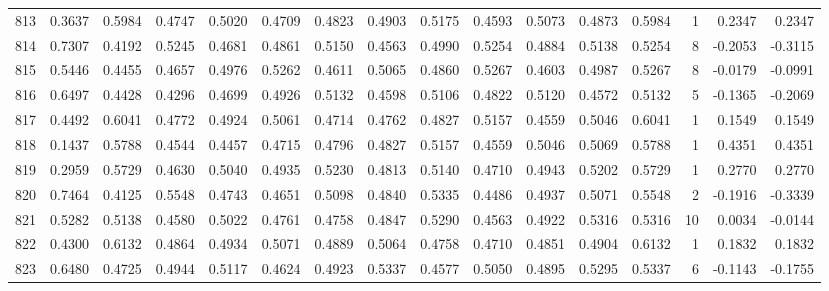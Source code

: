 \begin{tabular}{lrrrrrrrrrrrrrrr}
813 &      0.3637 &  0.5984 &  0.4747 &  0.5020 &  0.4709 &  0.4823 &  0.4903 &  0.5175 &  0.4593 &  0.5073 &   0.4873 &     0.5984 &      1 &                    0.2347 &                     0.2347 \\
814 &      0.7307 &  0.4192 &  0.5245 &  0.4681 &  0.4861 &  0.5150 &  0.4563 &  0.4990 &  0.5254 &  0.4884 &   0.5138 &     0.5254 &      8 &                   -0.2053 &                    -0.3115 \\
815 &      0.5446 &  0.4455 &  0.4657 &  0.4976 &  0.5262 &  0.4611 &  0.5065 &  0.4860 &  0.5267 &  0.4603 &   0.4987 &     0.5267 &      8 &                   -0.0179 &                    -0.0991 \\
816 &      0.6497 &  0.4428 &  0.4296 &  0.4699 &  0.4926 &  0.5132 &  0.4598 &  0.5106 &  0.4822 &  0.5120 &   0.4572 &     0.5132 &      5 &                   -0.1365 &                    -0.2069 \\
817 &      0.4492 &  0.6041 &  0.4772 &  0.4924 &  0.5061 &  0.4714 &  0.4762 &  0.4827 &  0.5157 &  0.4559 &   0.5046 &     0.6041 &      1 &                    0.1549 &                     0.1549 \\
818 &      0.1437 &  0.5788 &  0.4544 &  0.4457 &  0.4715 &  0.4796 &  0.4827 &  0.5157 &  0.4559 &  0.5046 &   0.5069 &     0.5788 &      1 &                    0.4351 &                     0.4351 \\
819 &      0.2959 &  0.5729 &  0.4630 &  0.5040 &  0.4935 &  0.5230 &  0.4813 &  0.5140 &  0.4710 &  0.4943 &   0.5202 &     0.5729 &      1 &                    0.2770 &                     0.2770 \\
820 &      0.7464 &  0.4125 &  0.5548 &  0.4743 &  0.4651 &  0.5098 &  0.4840 &  0.5335 &  0.4486 &  0.4937 &   0.5071 &     0.5548 &      2 &                   -0.1916 &                    -0.3339 \\
821 &      0.5282 &  0.5138 &  0.4580 &  0.5022 &  0.4761 &  0.4758 &  0.4847 &  0.5290 &  0.4563 &  0.4922 &   0.5316 &     0.5316 &     10 &                    0.0034 &                    -0.0144 \\
822 &      0.4300 &  0.6132 &  0.4864 &  0.4934 &  0.5071 &  0.4889 &  0.5064 &  0.4758 &  0.4710 &  0.4851 &   0.4904 &     0.6132 &      1 &                    0.1832 &                     0.1832 \\
823 &      0.6480 &  0.4725 &  0.4944 &  0.5117 &  0.4624 &  0.4923 &  0.5337 &  0.4577 &  0.5050 &  0.4895 &   0.5295 &     0.5337 &      6 &                   -0.1143 &                    -0.1755 \\

\end{tabular}
